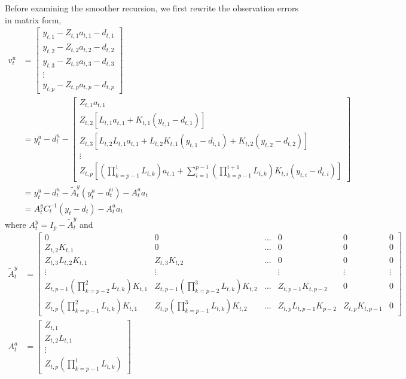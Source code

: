 \documentclass[12pt]{article}
\begin{document}
	Before examining the smoother recursion, we first rewrite the observation errors in matrix form, 
	\begin{align*}
	v_t^u &= \begin{bmatrix}
	y_{t,1} - Z_{t,1} a_{t,1} - d_{t,1}\\
	y_{t,2} - Z_{t,2} a_{t,2} - d_{t,2} \\
	y_{t,3} - Z_{t,3} a_{t,3} - d_{t,3} \\
	\vdots \\
	y_{t,p} - Z_{t,p} a_{t,p} - d_{t,p}
	\end{bmatrix} \\
	&= y_t^u - d_t^u - \begin{bmatrix}
	Z_{t,1} a_{t,1} \\
	Z_{t,2} [L_{t,1} a_{t,1} + K_{t,1} (y_{t,1} - d_{t,1})] \\
	Z_{t,3} [L_{t,2} L_{t,1} a_{t,1} + L_{t,2} K_{t,1} (y_{t,1} - d_{t,1}) + K_{t,2} (y_{t,2} - d_{t,2})] \\
	\vdots \\
	Z_{t,p} \left[\left(\prod_{k=p-1}^1 L_{t,k} \right) a_{t,1} + \sum_{i=1}^{p-1} \left(\prod_{k=p-1}^{i+1} L_{t,k} \right) K_{t,i} (y_{t,i} - d_{t,i}) \right]
	\end{bmatrix} \\
	&= y_t^u - d_t^u - \tilde{A}_t^y (y_t^u - d_t^u) - A_t^a a_t \\
	&= A_t^y C_t^{-1} (y_t - d_t) - A_t^a a_t
	\end{align*}
	where $A_t^y = I_p - \tilde{A}_t^y$ and 
	\begin{align*}
	\tilde{A}_t^y &= \begin{bmatrix}
	0 & 0 & \dots & 0 & 0 & 0 \\
	Z_{t,2} K_{t,1} & 0 & \dots & 0 & 0 & 0\\
	Z_{t,3} L_{t,2} K_{t,1} & Z_{t,3} K_{t,2} & \dots & 0 & 0 & 0  \\
	\vdots & \vdots &  & \vdots & \vdots & \vdots \\
	Z_{t,p-1} (\prod_{k=p-2}^2 L_{t,k}) K_{t,1} & Z_{t,p-1} (\prod_{k=p-2}^3 L_{t,k}) K_{t,2} & \dots & Z_{t,p-1} K_{t,p-2} & 0 & 0 \\
	Z_{t,p} (\prod_{k=p-1}^2 L_{t,k}) K_{t,1} & Z_{t,p} (\prod_{k=p-1}^3 L_{t,k}) K_{t,2} & \dots & Z_{t,p} L_{t,p-1} K_{p-2} & Z_{t,p} K_{t,p-1} & 0
	\end{bmatrix} \\
	A_t^a &= \begin{bmatrix}
	Z_{t,1} \\
	Z_{t,2} L_{t,1} \\
	\vdots \\
	Z_{t,p} \left(\prod_{k=p-1}^1 L_{t,k} \right) 
	\end{bmatrix}
	\end{align*}
\end{document}
